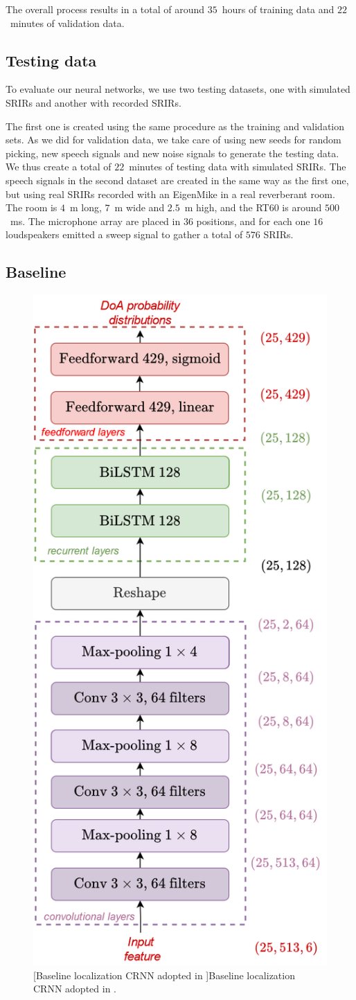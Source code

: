 The overall process results in a total of around $35$~hours of training data and $22$~minutes of validation data.

\subsection{Testing data}
\label{ss:tdvvTestData}

To evaluate our neural networks, we use two testing datasets, one with simulated SRIRs and another with recorded SRIRs. 

The first one is created using the same procedure as the training and validation sets. As we did for validation data, we take care of using new seeds for random picking, new speech signals and new noise signals to generate the testing data. We thus create a total of $22$~minutes of testing data with simulated SRIRs. The speech signals in the second dataset are created in the same way as the first one, but using real SRIRs recorded with an EigenMike in a real reverberant room. The room is $4$~m long, $7$~m wide and $2.5$~m high, and the RT60 is around $500$~ms. The microphone array are placed in $36$ positions, and for each one $16$ loudspeakers emitted a sweep signal to gather a total of $576$ SRIRs.

\subsection{Baseline}

\begin{figure}[t]
    \begin{center}
    \includegraphics[width=0.4\linewidth]{Images/chap6/perotinCRNN.png}
    [Baseline localization CRNN adopted in \cite{perotin_crnn-based_2019}]{Baseline localization CRNN adopted in \cite{perotin_crnn-based_2019}.}
    \label{fig:perotinCRNN}
    \end{center}
\end{figure}

